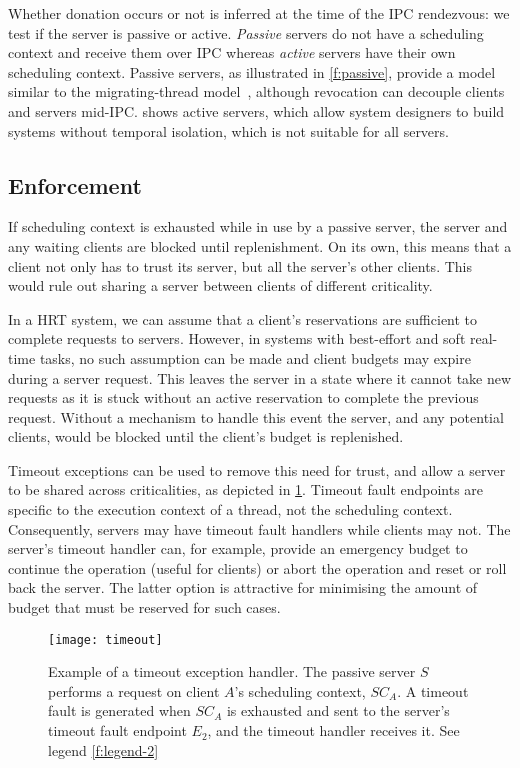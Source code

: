 Whether donation occurs or not is inferred at the time of the \gls{IPC} rendezvous: we test if the
server is passive or active. 
\emph{Passive} servers do not have a scheduling context 
and receive them over \gls{IPC} whereas \emph{active} servers have their own scheduling context. 
Passive servers, as illustrated in \cref{f:passive}, provide a model similar to the 
 migrating-thread model~\citep{Ford_Lepreau_94, Gabber_SBBS_99}, although revocation can decouple
 clients and servers mid-IPC.  shows active servers, which allow system designers to
build systems without temporal isolation, which is not suitable
for all servers.

\subsection{Enforcement}

If scheduling context is exhausted while in use by a passive server, the server and any waiting clients
are blocked until replenishment. On its own, this means that a client
not only has to trust its server, but all the server's other
clients. This would rule out sharing a server between clients of
different criticality.

In a \gls{HRT} system, we can assume that a client's reservations are sufficient to complete
requests to servers.  However, in systems with best-effort and soft real-time tasks, no such
assumption can be made and client budgets may expire during a server request.  This leaves the
server in a state where it cannot take new requests as it is stuck without an active reservation to
complete the previous request.  Without a mechanism to handle this event the server, and any
potential clients, would be blocked until the client's budget is replenished.

Timeout exceptions can be used to remove this need for trust, and
allow a server to be shared across criticalities, as depicted in \cref{f:timeout}. Timeout fault endpoints are specific to the
execution context of a thread, not the scheduling context. Consequently, servers may have timeout
fault handlers while clients may not. The 
server's timeout handler can, for example, provide an emergency budget
to continue the operation (useful for  clients) or abort
the operation and reset or roll back the server. The latter option is
attractive for minimising the amount of budget that must be reserved
for such cases.

\begin{figure}
    \centering
    \texttt{[image: timeout]}
    \caption[Example of a timeout exception handler.]{Example of a timeout exception handler. The passive server $S$ performs a request on
    client $A$'s scheduling context, $SC_{A}$. A timeout fault is generated when $SC_{A}$ is
exhausted and sent to the server's timeout fault endpoint $E_{2}$, and the timeout handler receives
it. See legend \cref{f:legend-2}}
    \label{f:timeout}
\end{figure}


